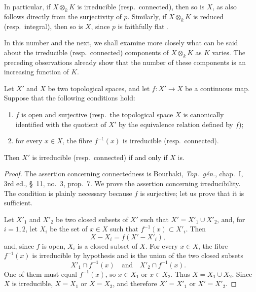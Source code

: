 \begin{env}[4.4.1]
In particular, if $X\otimes_k K$ is irreducible (resp.\ connected), then
so is $X$, as also follows directly from the surjectivity of $p$.
Similarly, if $X\otimes_k K$ is reduced (resp.\ integral), then so is
$X$, since $p$ is faithfully flat .

In this number and the next, we shall examine more closely what can be
said about the irreducible (resp.\ connected) components of
$X\otimes_k K$ as $K$ varies.
The preceding observations already show that the number of these
components is an increasing function of $K$.
\end{env}

\begin{lemma}[4.4.2]
\label{IV.4.4.2}
Let $X'$ and $X$ be two topological spaces, and let
$f:X'\to X$ be a continuous map.
Suppose that the following conditions hold:
\begin{enumerate}
\item[\rm(i)]
\label{IV.4.4.2.i}
$f$ is open and surjective (resp.\ the topological space $X$ is
canonically identified with the quotient of $X'$ by the equivalence
relation defined by $f$);


\item[\rm(ii)]
\label{IV.4.4.2.ii}
for every $x\in X$, the fibre $f^{-1}(x)$ is irreducible
(resp.\ connected).
\end{enumerate}
Then $X'$ is irreducible (resp.\ connected) if and only if $X$ is.
\end{lemma}

\begin{proof}
The assertion concerning connectedness is Bourbaki,
\emph{Top.\ g\'en.}, chap.~I, 3rd ed., \S~11, no.~3, prop.~7.
We prove the assertion concerning irreducibility.
The condition is plainly necessary because $f$ is surjective; let us
prove that it is sufficient.

Let $X'_1$ and $X'_2$ be two closed subsets of $X'$ such that
$X'=X'_1\cup X'_2$, and, for $i=1,2$, let $X_i$ be the set of
$x\in X$ such that $f^{-1}(x)\subset X'_i$.
Then
\[
X-X_i=f(X'-X'_i),
\]
and, since $f$ is open, $X_i$ is a closed subset of $X$.
For every $x\in X$, the fibre $f^{-1}(x)$ is irreducible by hypothesis
and is the union of the two closed subsets
\[
X'_1\cap f^{-1}(x)
\quad\text{and}\quad
X'_2\cap f^{-1}(x).
\]
One of them must equal $f^{-1}(x)$, so $x\in X_1$ or $x\in X_2$.
Thus $X=X_1\cup X_2$.
Since $X$ is irreducible, $X=X_1$ or $X=X_2$, and therefore
$X'=X'_1$ or $X'=X'_2$.
\end{proof}

